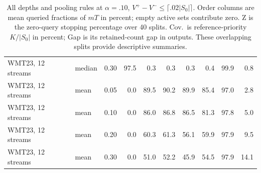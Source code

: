 \begin{table}[t]
\begin{tabular}{llrrrrrrrr}
WMT23, 12 streams & median & 0.30 & 97.5 & 0.3 & 0.3 & 0.3 & 0.4 & 99.9 & 0.8 \\
WMT23, 12 streams & mean & 0.05 & 0.0 & 89.5 & 90.2 & 89.9 & 85.4 & 97.0 & 2.8 \\
WMT23, 12 streams & mean & 0.10 & 0.0 & 86.0 & 86.8 & 86.5 & 81.3 & 97.8 & 5.0 \\
WMT23, 12 streams & mean & 0.20 & 0.0 & 60.3 & 61.3 & 56.1 & 59.9 & 97.9 & 9.5 \\
WMT23, 12 streams & mean & 0.30 & 0.0 & 51.0 & 52.2 & 45.9 & 54.5 & 97.9 & 14.1 \\
\bottomrule
\end{tabular}
\caption{All depths and pooling rules at $\alpha=.10$, $V^+-V^-\le\lceil.02|S_0|\rceil$. Order columns are mean queried fractions of $mT$ in percent; empty active sets contribute zero. Z is the zero-query stopping percentage over 40 splits. Cov.\ is reference-priority $K/|S_0|$ in percent; Gap is its retained-count gap in outputs. These overlapping splits provide descriptive summaries.}
\label{tab:all-tolerant}
\end{table}
